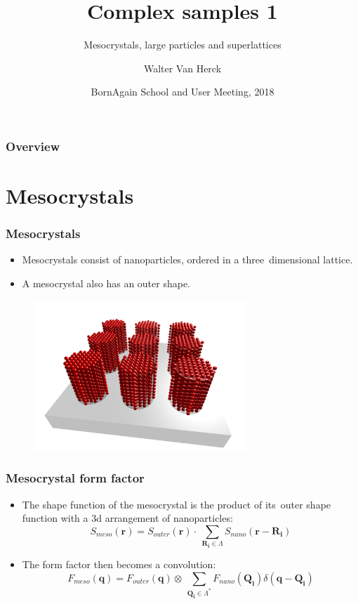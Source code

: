 \documentclass{beamer}
\title{Complex samples 1}
\subtitle{Mesocrystals, large particles and superlattices}
\author
{Walter Van Herck\inst{1}}
\institute[JCNS at MLZ] %
{
  \inst{1}%
  J\"ulich Centre for Neutron Science at MLZ
}
\date[BornAgain] %
{BornAgain School and User Meeting, 2018}
\begin{document}
\frame[plain]{\titlepage}

\begin{frame}
    \frametitle{Overview}
    \tableofcontents
\end{frame}

\section{Mesocrystals}

\begin{frame}
    \frametitle{Mesocrystals}
        \begin{itemize}
            \item Mesocrystals consist of nanoparticles, ordered in a three\
                  dimensional lattice.
            \item A mesocrystal also has an outer shape.
        \end{itemize}
        \begin{figure}
            \includegraphics[width=8cm]{mesocrystal.png}
        \end{figure}
\end{frame}

\begin{frame}
    \frametitle{Mesocrystal form factor}
        \begin{itemize}
            \item The shape function of the mesocrystal is the product of its\
                  outer shape function with a 3d arrangement of nanoparticles:
                  \[ S_{meso}(\mathbf r) = S_{outer}(\mathbf r)\cdot \
                  \sum_{\mathbf{R_i}\in\Lambda} S_{nano}\left(\mathbf r - \mathbf{R_i}\right)\]
            \item The form factor then becomes a convolution:
                  \[ F_{meso}(\mathbf q) = F_{outer}(\mathbf q)\otimes \
                  \sum_{\mathbf{Q_i}\in\Lambda^*} F_{nano}(\mathbf{Q_i}) \delta\left(\mathbf q- \mathbf{Q_i}\right)\]
        \end{itemize}
\end{frame}
\end{document}
